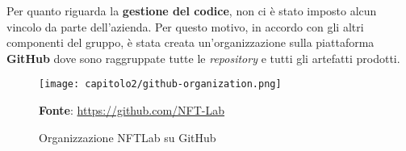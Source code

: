 Per quanto riguarda la \textbf{gestione del codice}, non ci è stato imposto alcun vincolo da parte dell'azienda. Per questo motivo, in accordo con gli altri componenti del gruppo, è stata creata un'organizzazione sulla piattaforma \textbf{GitHub} dove sono raggruppate tutte le \textit{repository} e tutti gli artefatti prodotti.


\begin{figure}[!h]
  \centering
  \texttt{[image: capitolo2/github-organization.png]}
  \caption{Organizzazione NFTLab su GitHub}
  \textbf{Fonte}: \href{https://github.com/NFT-Lab}{https://github.com/NFT-Lab}
\end{figure}
